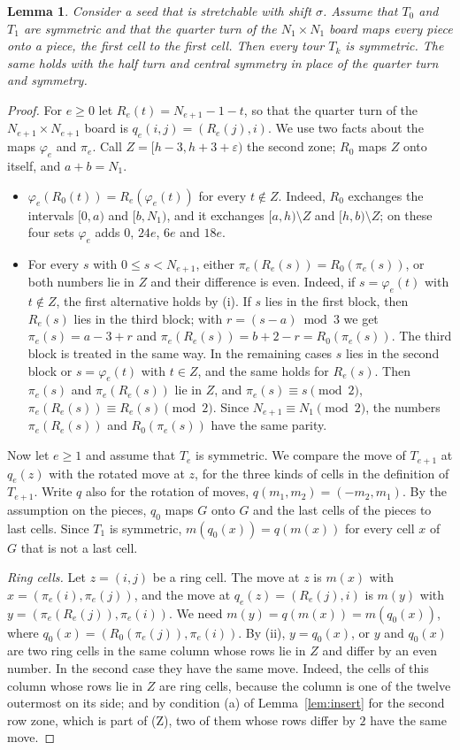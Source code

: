 \documentclass[11pt]{amsart}
\newtheorem{lemma}[theorem]{Lemma}
\theoremstyle{remark}
\begin{document}
\begin{lemma}\label{lem:symstretch}
Consider a seed that is stretchable with shift $\sigma$. Assume that $T_0$ and $T_1$ are symmetric and that the
quarter turn of the $N_1\times N_1$ board maps every piece onto a piece, the first cell to the first cell. Then
every tour $T_k$ is symmetric. The
same holds with the half turn and central symmetry in place of the quarter turn and symmetry.
\end{lemma}
\begin{proof}
For $e\ge0$ let $R_e(t)=N_{e+1}-1-t$, so that the quarter turn of the $N_{e+1}\times N_{e+1}$ board is
$q_e(i,j)=(R_e(j),i)$. We use two facts about the maps $\varphi_e$ and $\pi_e$. Call $Z=[h-3,h+3+\varepsilon)$ the
second zone; $R_0$ maps $Z$ onto itself, and $a+b=N_1$.
\begin{itemize}
\item[(i)] $\varphi_e(R_0(t))=R_e(\varphi_e(t))$ for every $t\notin Z$. Indeed, $R_0$ exchanges the intervals $[0,a)$
and $[b,N_1)$, and it exchanges $[a,h)\setminus Z$ and $[h,b)\setminus Z$; on these four sets $\varphi_e$ adds
$0$, $24e$, $6e$ and $18e$.
\item[(ii)] For every $s$ with $0\le s<N_{e+1}$, either $\pi_e(R_e(s))=R_0(\pi_e(s))$, or both numbers lie in $Z$ and
their difference is even. Indeed, if $s=\varphi_e(t)$ with $t\notin Z$, the first alternative holds by (i). If $s$
lies in the first block, then $R_e(s)$ lies in the third block; with $r=(s-a)\bmod 3$ we get
$\pi_e(s)=a-3+r$ and $\pi_e(R_e(s))=b+2-r=R_0(\pi_e(s))$. The third block is treated in the same way. In the
remaining cases $s$ lies in the second block or $s=\varphi_e(t)$ with $t\in Z$, and the same holds for $R_e(s)$.
Then $\pi_e(s)$ and $\pi_e(R_e(s))$ lie in $Z$, and $\pi_e(s)\equiv s\pmod 2$, $\pi_e(R_e(s))\equiv R_e(s)\pmod 2$.
Since $N_{e+1}\equiv N_1\pmod 2$, the numbers $\pi_e(R_e(s))$ and $R_0(\pi_e(s))$ have the same parity.
\end{itemize}
Now let $e\ge1$ and assume that $T_e$ is symmetric. We compare the move of $T_{e+1}$ at $q_e(z)$ with the
rotated move at $z$, for the three kinds of cells in the definition of $T_{e+1}$. Write $q$ also for the
rotation of moves, $q(m_1,m_2)=(-m_2,m_1)$. By the assumption on the pieces, $q_0$ maps $G$ onto $G$ and the
last cells of the pieces to last cells. Since $T_1$ is symmetric, $m(q_0(x))=q(m(x))$ for every cell $x$ of $G$
that is not a last cell.

\emph{Ring cells.} Let $z=(i,j)$ be a ring cell. The move at
$z$ is $m(x)$ with $x=(\pi_e(i),\pi_e(j))$, and the move at $q_e(z)=(R_e(j),i)$ is $m(y)$ with
$y=(\pi_e(R_e(j)),\pi_e(i))$. We need $m(y)=q(m(x))=m(q_0(x))$, where $q_0(x)=(R_0(\pi_e(j)),\pi_e(i))$.
By (ii), $y=q_0(x)$, or $y$ and $q_0(x)$ are two ring cells in the same column whose rows lie in $Z$ and
differ by an even number. In the second case they have the same move. Indeed, the cells of this column whose rows
lie in $Z$ are ring cells, because the column is one of the twelve outermost on its side; and by condition (a) of
Lemma~\ref{lem:insert} for the second row zone, which is part of (Z), two of them whose rows differ by $2$ have the
same move.


\end{proof}
\end{document}
